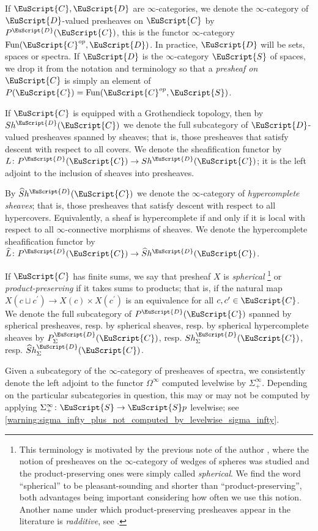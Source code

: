 \documentclass[oneside,a4paper]{amsart}
\newcommand{\euscr}[1]{\EuScript{#1}} %
\newcommand{\ccat}{\euscr{C}} %
\newcommand{\dcat}{\euscr{D}} %
\newcommand{\Fun}{\textnormal{Fun}} %
\newcommand{\spaces}{\euscr{S}} %
\newcommand{\spectra}{\euscr{S}p} %
\newcommand{\hpsheaves}{\widehat{S}h} %
\newcommand{\sigmainfty}{\Sigma^{\infty}_{+}} %
\newcommand{\omegainfty}{\Omega^{\infty}} %
\theoremstyle{plain}
\theoremstyle{definition}
\theoremstyle{remark}
\begin{document}
If $\ccat, \dcat$ are $\infty$-categories, we denote the $\infty$-category of $\dcat$-valued presheaves on $\ccat$ by $P^{\dcat}(\ccat)$, this is the functor $\infty$-category $\Fun(\ccat^{op},\dcat)$.  In practice, $\dcat$ will be sets, spaces or spectra. If $\euscr{D}$ is the $\infty$-category $\spaces$ of spaces, we drop it from the notation and terminology so that a \emph{presheaf on $\ccat$} is simply an element of $P(\ccat) = \Fun(\ccat^{op}, \spaces)$.

If $\ccat$ is equipped with a Grothendieck topology, then by $Sh^{\dcat}(\ccat)$ we denote the full subcategory of $\dcat$-valued presheaves spanned by sheaves; that is, those presheaves that satisfy descent with respect to all covers. We denote the sheafification functor by $L\colon P^{\dcat}(\ccat) \rightarrow Sh^{\dcat}(\ccat)$; it is the left adjoint to the inclusion of sheaves into presheaves. 

By $\hpsheaves^{\dcat}(\ccat)$ we denote the $\infty$-category of \emph{hypercomplete sheaves}; that is, those presheaves that satisfy descent with respect to all hypercovers. Equivalently, a sheaf is hypercomplete if and only if it is local with respect to all $\infty$-connective morphisms of sheaves. We denote the hypercomplete sheafification functor by $\widehat{L}\colon P^{\dcat}(\ccat) \rightarrow \hpsheaves^{\dcat}(\ccat)$. 

If $\ccat$ has finite sums, we say that presheaf $X$ is \emph{spherical} \footnote{This terminology is motivated by the previous note of the author \cite{pstrkagowski2017moduli}, where the notion of presheaves on the $\infty$-category of wedges of spheres was studied and the product-preserving ones were simply called \emph{spherical}. We find the word ``spherical'' to be pleasant-sounding and shorter than ``product-preserving'', both advantages being important considering how often we use this notion. Another name under which product-preserving presheaves appear in the literature is \emph{radditive}, see \cite{voevodsky2010simplicial}.} or \emph{product-preserving} if it takes sums to products; that is, if the natural map $X(c \sqcup c^{\prime}) \rightarrow X(c) \times X(c^{\prime})$ is an equivalence for all $c, c^\prime \in \ccat$. We denote the full subcategory of $P^{\dcat}(\ccat)$ spanned by spherical presheaves, resp. by spherical sheaves, resp. by spherical hypercomplete sheaves by $P^{\dcat}_{\Sigma}(\ccat)$, resp. $Sh^{\dcat}_{\Sigma}(\ccat)$, resp. $\widehat{S}h^{\dcat}_{\Sigma}(\ccat)$. 

Given a subcategory of the $\infty$-category of presheaves of spectra, we consistently denote the left adjoint to the functor $\omegainfty$ computed levelwise by $\sigmainfty$. Depending on the particular subcategories in question, this may or may not be computed by applying $\sigmainfty\colon \spaces \rightarrow \spectra$ levelwise; see \cref{warning:sigma_infty_plus_not_computed_by_levelwise_sigma_infty}. 
\end{document}

